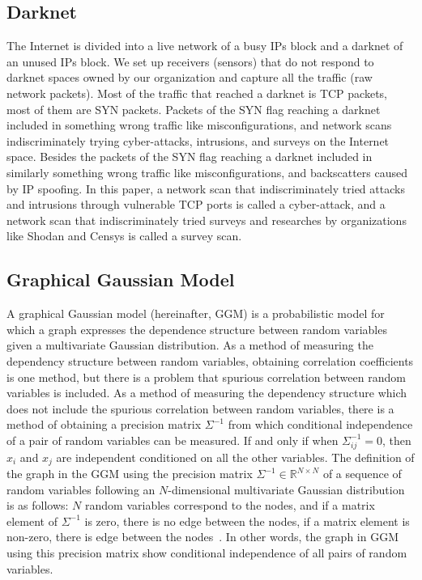 \documentclass[conference]{IEEEtran}
\begin{document}
\subsection{Darknet}
The Internet is divided into a live network of a busy IPs block and a darknet of an unused IPs block.
We set up receivers (sensors) that do not respond to darknet spaces owned by our organization and capture all the traffic (raw network packets).
Most of the traffic that reached a darknet is TCP packets, most of them are SYN packets.
Packets of the SYN flag reaching a darknet included in something wrong traffic like misconfigurations, and network scans indiscriminately trying cyber-attacks, intrusions, and surveys on the Internet space.
Besides the packets of the SYN flag reaching a darknet included in similarly something wrong traffic like misconfigurations, and backscatters caused by IP spoofing.
In this paper, a network scan that indiscriminately tried attacks and intrusions through vulnerable TCP ports is called a cyber-attack, and a network scan that indiscriminately tried surveys and researches by organizations like Shodan and Censys is called a survey scan.



\subsection{Graphical Gaussian Model}
A graphical Gaussian model (hereinafter, GGM) is a probabilistic model for which a graph expresses the dependence structure between random variables given a multivariate Gaussian distribution.
As a method of measuring the dependency structure between random variables, obtaining correlation coefficients is one method, but there is a problem that spurious correlation between random variables is included.
As a method of measuring the dependency structure which does not include the spurious correlation between random variables, there is a method of obtaining a precision matrix $\Sigma^{-1}$ from which conditional independence of a pair of random variables can be measured.
If and only if when $\Sigma^{-1}_{ij}=0$, then $x_ {i}$ and $x_ {j}$ are independent conditioned on all the other variables.
The definition of the graph in the GGM using the precision matrix $\Sigma^{-1}\in\mathbb{R}^{N \times N}$ of a sequence of random variables following an $N$-dimensional multivariate Gaussian distribution is as follows: $N$ random variables correspond to the nodes, and if a matrix element of $\Sigma^{-1}$ is zero, there is no edge between the nodes, if a matrix element is non-zero, there is edge between the nodes~\cite{Ide}.
In other words, the graph in GGM using this precision matrix show conditional independence of all pairs of random variables.
\end{document}
